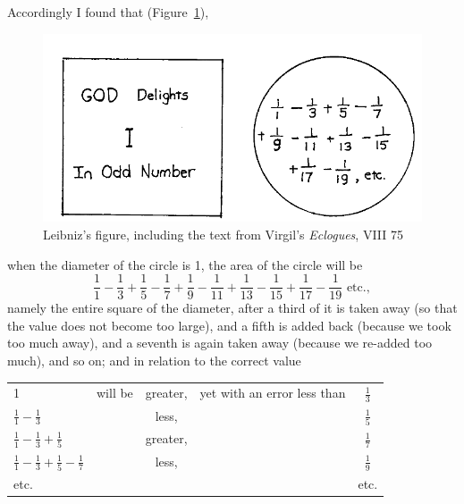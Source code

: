 \documentclass[polutonikogreek,english,twoside,openright]{article}
\begin{document}
Accordingly I found that (Figure~\ref{God'sdelight}),
\begin{figure}[htp]
  \begin{center}
    \includegraphics[width=.9\textwidth]{fig/Figure60}
        \caption{Leibniz's figure, including the text from Virgil's {\em Eclogues}, VIII 75}
    \label{God'sdelight}
  \end{center}
\end{figure}
when the diameter of the circle is 1, the area of the circle will be
$$\frac{1}{1} - \frac{1}{3} + \frac{1}{5} -
\frac{1}{7} + \frac{1}{9} - \frac{1}{11} + \frac{1}{13} - \frac{1}{15}
+ \frac{1}{17} - \frac{1}{19} \mbox{ etc.},$$ \hspace{-.75em} namely the entire square of the
diameter, after a third of it is taken away (so that the value does
not become too large), and a fifth is added back (because we took too
much away), and a seventh is again taken away (because we re-added too
much), and so on; and in relation to the correct value

\vspace*{1ex}

\begin{tabular}{lcccc}
  \rule[-1.5ex]{0ex}{3ex} 1 & will be & greater, & yet with an error less than & $\frac{1}{3}$\\
  \rule[-1.5ex]{0ex}{3ex} $\frac{1}{1} - \frac{1}{3}$ & \dotfill
                                      & less, &\dotfill & $\frac{1}{5}$ \\
  \rule[-1.5ex]{0ex}{3ex} $\frac{1}{1} - \frac{1}{3} + \frac{1}{5}$ & \dotfill
                                      & greater, &\dotfill & $\frac{1}{7}$ \\
  \rule[-1.5ex]{0ex}{3ex} $\frac{1}{1} - \frac{1}{3} +\frac{1}{5} - \frac{1}{7}$
                            & \dotfill & less, &\dotfill & $\frac{1}{9}$ \\
  \rule[-1.5ex]{0ex}{3ex} etc. &  & & & etc.\\
\end{tabular}
\end{document}
